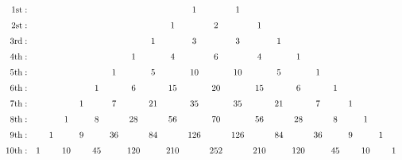 \documentclass{standalone}
\begin{document}
$\begin{array}{rccccccccccccccccccccc}
\textrm{1st}:&    &    &    &    &    &    &    &    &    &  1 &    &  1\\\noalign{\smallskip\smallskip}
\textrm{2st}:&    &    &    &    &    &    &    &    &  1 &    &  2 &    &  1\\\noalign{\smallskip\smallskip}
\textrm{3rd}:&    &    &    &    &    &    &    &  1 &    &  3 &    &  3 &    &  1\\\noalign{\smallskip\smallskip}
\textrm{4th}:&    &    &    &    &    &    &  1 &    &  4 &    &  6 &    &  4 &    &  1\\\noalign{\smallskip\smallskip}
\textrm{5th}:&    &    &    &    &    &  1 &    &  5 &    & 10 &    & 10 &    &  5 &    &  1\\\noalign{\smallskip\smallskip}
\textrm{6th}:&    &    &    &    &  1 &    &  6 &    & 15 &    & 20 &    & 15 &    &  6 &    &  1\\\noalign{\smallskip\smallskip}
\textrm{7th}:&    &    &    &  1 &    &  7 &    & 21 &    & 35 &    & 35 &    & 21 &    &  7 &    &  1\\\noalign{\smallskip\smallskip}
\textrm{8th}:&    &    &  1 &    &  8 &    & 28 &    & 56 &    & 70 &    & 56 &    & 28 &    &  8 &    &  1\\\noalign{\smallskip\smallskip}
\textrm{9th}:&    &  1 &    &  9 &    & 36 &    & 84 &    & 126 &    & 126 &    & 84 &    & 36 &    &  9 &    &  1\\\noalign{\smallskip\smallskip}
\textrm{10th}:&  1 &    & 10 &    & 45 &    & 120 &    & 210 &    & 252 &    & 210 &    & 120 &    & 45 &    & 10 &    &  1\\\noalign{\smallskip\smallskip}
\end{array}$
\end{document}
